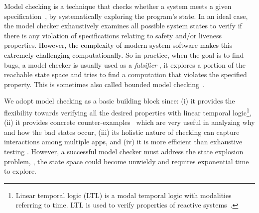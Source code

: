 Model checking is a technique that checks
whether a system meets a given specification~\cite{jhala2009software},
by systematically exploring the program's state.
In an ideal case, the model checker exhaustively examines all possible system states to verify
{\color{black}if there is any violation} of specifications relating
to safety and/or liveness properties.
\textcolor{black}{However, the complexity of modern system software makes this extremely challenging computationally.}
So in practice, when the goal is to find bugs, a model checker is usually
used as a \emph{falsifier} \ie, it explores a portion of the reachable state
space and tries to find a computation that violates the specified property.
This is sometimes
also called bounded model checking~\cite{Biere1999:BMC, Kroening2014:CBMC, Merz2012:LLBMC, Cordeiro2012:ESBMC,Roya:networkprotocol}.

We adopt model checking as a basic building block since:
(i) it provides the flexibility towards verifying
all the desired properties with linear temporal logic\footnote{
  Linear temporal logic (LTL) is
  a modal temporal logic with modalities referring to time.
  LTL is used to verify
  properties of reactive systems~\cite{Baier:modelchecking}.},
(ii) it provides concrete counter-examples~\cite{Baier:modelchecking,Spin:intro}
which are very useful in analyzing why and how the bad states occur,
(iii) its holistic nature of checking can capture interactions among multiple apps,
and (iv) it is more efficient than exhaustive testing \cite{10.1007/978-3-319-70389-3_7}.
%
However, a successful model checker must address the state explosion problem,
\ie, the state space could become unwieldy and requires exponential time to explore.

